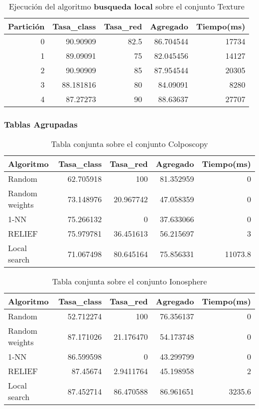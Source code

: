 \documentclass[size=a4, parskip=half, titlepage=false, toc=flat, toc=bib, 12pt]{scrartcl}
\begin{document}
 \begin{table}[ht]
  \centering
  \begin{tabular}[t]{rrrrr}
  \toprule
  Partición &Tasa\_class &Tasa\_red & Agregado & Tiempo(ms)\\
  \midrule
0         & 90.90909  & 82.5     & 86.704544 & 17734  \\
1         & 89.09091  & 75       & 82.045456 & 14127  \\
2         & 90.90909  & 85       & 87.954544 & 20305  \\
3         & 88.181816 & 80       & 84.09091  & 8280   \\
4         & 87.27273  & 90       & 88.63637  & 27707  \\
\bottomrule
  \end{tabular}
  \caption{Ejecución del algoritmo \textbf{busqueda local} sobre el conjunto Texture}
  \end{table}%

\newpage

\subsubsection{Tablas Agrupadas}

 \begin{table}[ht]
  \centering
  \begin{tabular}[t]{lrrrr}
  \toprule
  Algoritmo &Tasa\_class &Tasa\_red & Agregado & Tiempo(ms)\\
  \midrule
 Random             & 62.705918 & 100 & 81.352959 & 0\\
 Random weights     & 73.148976 & 20.967742 & 47.058359 & 0\\
 1-NN               & 75.266132 & 0 & 37.633066 & 0\\
 RELIEF             & 75.979781 & 36.451613 & 56.215697 & 3\\
 Local search       & 71.067498 & 80.645164 & 75.856331 & 11073.8\\
  \bottomrule
  \end{tabular}
  \caption{Tabla conjunta sobre el conjunto Colposcopy }
  \end{table}%

 \begin{table}[ht]
  \centering
  \begin{tabular}[t]{lrrrr}
  \toprule
  Algoritmo &Tasa\_class &Tasa\_red & Agregado & Tiempo(ms)\\
  \midrule
 Random & 52.712274 & 100 & 76.356137 & 0\\
 Random weights & 87.171026 & 21.176470 & 54.173748 & 0\\
1-NN & 86.599598 & 0 & 43.299799 & 0\\
 RELIEF& 87.45674 & 2.9411764 & 45.198958 & 2\\
 Local search& 87.452714 & 86.470588 & 86.961651 & 3235.6\\
  \bottomrule
  \end{tabular}
  \caption{Tabla conjunta sobre el conjunto Ionosphere}
  \end{table}%
\end{document}
